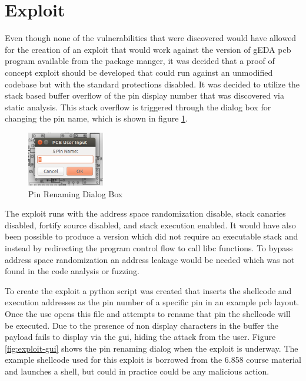 \documentclass[12pt]{article}
\begin{document}
\section{Exploit}
\label{S:5}
Even though none of the vulnerabilities that were discovered would have allowed for the creation of an exploit that would work against the version of gEDA pcb program available from the package manger, it was decided that a proof of concept exploit should be developed that could run against an unmodified codebase but with the standard protections disabled. It was decided to utilize the stack based buffer overflow of the pin display number that was discovered via static analysis. This stack overflow is triggered through the dialog box for changing the pin name, which is shown in figure \ref{fig:rename-gui}. 
\begin{figure}
\centering
\includegraphics[width=0.3\textwidth]{images/rename-gui-cropped.png}
\caption{Pin Renaming Dialog Box}
\label{fig:rename-gui}
\end{figure}

The exploit runs with the address space randomization disable, stack canaries disabled, fortify source disabled, and stack execution enabled. It would have also been possible to produce a version which did not require an executable stack and instead by redirecting the program control flow to call libc functions. To bypass address space randomization an address leakage would be needed which was not found in the code analysis or fuzzing. 

To create the exploit a python script was created that inserts the shellcode and execution addresses as the pin number of a specific pin in an example pcb layout. Once the use opens this file and attempts to rename that pin the shellcode will be executed. Due to the presence of non display characters in the buffer the payload fails to display via the gui, hiding the attack from the user. Figure \ref{fig:exploit-gui} shows the pin renaming dialog when the exploit is underway. The example shellcode used for this exploit is borrowed from the 6.858 course material and launches a shell, but could in practice could be any malicious action. 
\end{document}
